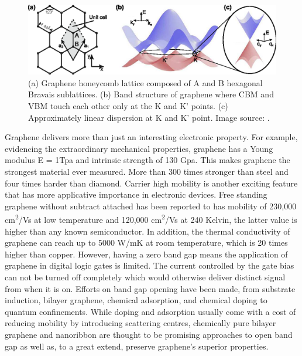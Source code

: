 \begin{figure}[htbp!] 
\centering  
\includegraphics[width=\textwidth]{gra_lat_band.eps}
\caption[Graphene lattice and band structure.]{(a) Graphene honeycomb lattice composed of A and B hexagonal Bravais sublattices. (b) Band structure of graphene where CBM and VBM touch each other only at the K and K' points. (c) Approximately linear dispersion at K and K' point. Image source: \cite{Guttinger2012}. }  
\label{fig:gra_band}
\end{figure} 

Graphene delivers more than just an interesting electronic property. For example, evidencing the extraordinary mechanical properties, graphene has a Young modulus E = 1Tpa and intrinsic strength of 130 Gpa\cite{Lee385}. This makes graphene the strongest material ever measured. More than 300 times stronger than steel and four times harder than diamond. Carrier high mobility is another exciting feature that has more applicative importance in electronic devices. Free standing graphene without subtract attached has been reported to has mobility of 230,000 \si{cm^2/Vs} at low temperature\cite{Bolotin2008a} and 120,000 \si{cm^2/Vs} at 240 Kelvin, the latter value is higher than any known semiconductor\cite{Bolotin2008b}. In addition, the thermal conductivity of graphene can reach up to 5000 \si{W/mK} at room temperature, which is 20 times higher than copper\cite{balandin2008}. However, having a zero band gap means the application of graphene in digital logic gates is limited. The current controlled by the gate bias can not be turned off completely which would otherwise deliver distinct signal from when it is on. Efforts on band gap opening have been made, from substrate induction\cite{Ci2010,zhou2007}, bilayer graphene\cite{mccann2006,castro2007}, chemical adsorption\cite{Elias2009,Jeon2011}, and chemical doping\cite{zhou2008} to quantum confinements\cite{Nakada1996,Barone2006}.  While doping and adsorption usually come with a cost of reducing mobility by introducing scattering centres, chemically pure bilayer graphene and nanoribbon are thought to be promising approaches to open band gap as well as, to a great extend, preserve graphene's superior properties.

